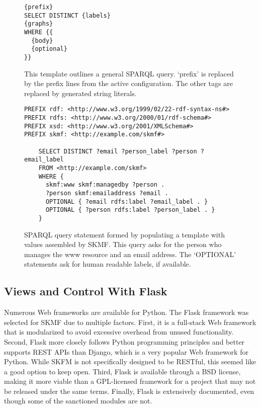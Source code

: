 \begin{figure}[p]
\singlespace
\begin{verbatim}
{prefix}
SELECT DISTINCT {labels}
{graphs}
WHERE {{
  {body}
  {optional}
}}
\end{verbatim}
\caption[Template for SPARQL query statements]
 {\narrower This template outlines a general SPARQL query. `prefix' is replaced by the prefix lines from the active configuration. The other tags are replaced by generated string literals.
 }
\label{sparql-template}
\end{figure}

\begin{figure}[p]
\singlespace
\begin{verbatim}
PREFIX rdf: <http://www.w3.org/1999/02/22-rdf-syntax-ns#>
PREFIX rdfs: <http://www.w3.org/2000/01/rdf-schema#>
PREFIX xsd: <http://www.w3.org/2001/XMLSchema#>
PREFIX skmf: <http://example.com/skmf#>

    SELECT DISTINCT ?email ?person_label ?person ?email_label
    FROM <http://example.com/skmf>
    WHERE {
      skmf:www skmf:managedby ?person .
      ?person skmf:emailaddress ?email .
      OPTIONAL { ?email rdfs:label ?email_label . }
      OPTIONAL { ?person rdfs:label ?person_label . }
    }
\end{verbatim}
\caption[Generated SPARQL query statement]
 {\narrower SPARQL query statement formed by populating a template with values assembled by SKMF. This query asks for the person who manages the www resource and an email address. The `OPTIONAL' statements ask for human readable labels, if available.
 }
\label{sparql-statement}
\end{figure}


\subsection{Views and Control With Flask}

Numerous Web frameworks are available for Python. The Flask framework was selected for SKMF due to multiple factors. First, it is a full-stack Web framework that is modularized to avoid excessive overhead from unused functionality. Second, Flask more closely follows Python programming principles and better supports REST APIs than Django, which is a very popular Web framework for Python. While SKFM is not specifically designed to be RESTful, this seemed like a good option to keep open. Third, Flask is available through a BSD license, making it more viable than a GPL-licensed framework for a project that may not be released under the same terms. Finally, Flask is extensively documented, even though some of the sanctioned modules are not.


